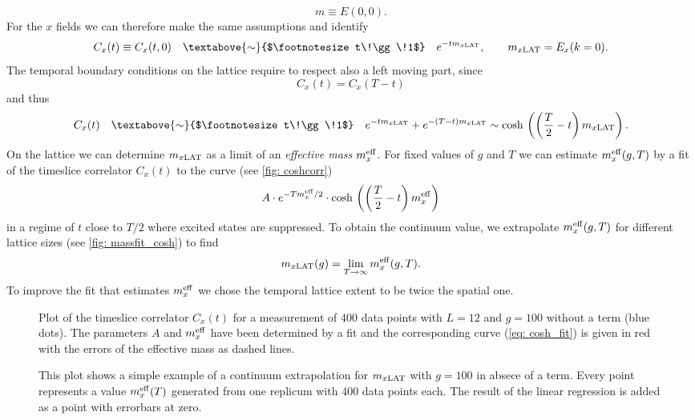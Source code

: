 %
%
\begin{equation}
m \equiv E(0,0).
\end{equation}
%
%
For the $x$ fields we can therefore make the same assumptions and identify
%
%
\begin{equation}
C_{x}(t) \equiv C_{x}(t,0) \quad \textabove{\sim}{$\footnotesize t\!\gg\!1$} \quad e^{-tm_{x \rm LAT}}, \qquad m_{x\rm LAT} = E_{x}(k=0).
\end{equation}
%
%
The temporal boundary conditions on the lattice require to respect also a left moving part, since
%
%
\begin{equation}
C_{x}(t) = C_{x}(T-t)
\end{equation}
%
%
and thus
%
%
\begin{equation}
C_{x}(t) \quad \textabove{\sim}{$\footnotesize t\!\gg\!1$} \quad e^{-tm_{x \rm LAT}}+e^{-(T-t)m_{x \rm LAT}} \sim \text{cosh\,}\left(\left(\frac{T}{2}-t\right) m_{x\rm LAT}\right).
\end{equation}
%
%
%
%
On the lattice we can determine $m_{x\rm LAT}$ as a limit of an \textit{effective mass} $m_{x}^{\rm eff}$. For fixed values of $g$ and $T$ we can estimate $m_{x}^{\rm eff}(g,T)$ by a fit of the timeslice correlator $C_{x}(t)$ to the curve (see \autoref{fig: coshcorr})
%
%
\begin{equation}
A\cdot e^{-Tm_{x}^{\rm eff}/2}\cdot\text{cosh\,}\left(\left(\frac{T}{2}-t\right) m_{x}^{\rm eff}\right)
\label{eq: cosh_fit}
\end{equation}
%
%
in a regime of $t$ close to $T/2$ where excited states are suppressed. To obtain the continuum value, we extrapolate $m_{x}^{\rm eff}(g,T)$ for different lattice sizes (see \autoref{fig: massfit_cosh}) to find
%
%
\begin{equation}
m_{x\rm LAT}(g) = \lim\limits_{T\to \infty} m_{x}^{\rm eff}(g,T).
\end{equation}
To improve the fit that estimates $m_{x}^{\rm eff}$ we chose the temporal lattice extent to be twice the spatial one.
%
%
%
\begin{figure}
\centering

\caption{Plot of the timeslice correlator $C_{x}(t)$ for a measurement of 400 data points with $L=12$ and $g=100$ without a  term (blue dots). The parameters $A$ and $m_{x}^{\rm eff}$ have been determined by a fit and the corresponding curve (\ref{eq: cosh_fit}) is given in red with the errors of the effective mass as dashed lines.\label{fig: coshcorr}}
\end{figure}
%
%
\begin{figure}
\centering

\caption{This plot shows a simple example of a continuum extrapolation for $m_{x\rm LAT}$ with $g=100$ in absece of a  term. Every point represents a value $m_{x}^{\rm eff}(T)$ generated from one replicum with 400 data points each. The result of the linear regression is added as a point with errorbars at zero. \label{fig: massfit_cosh}}
\end{figure}
%
%
%
%
%
%
%
%
%
